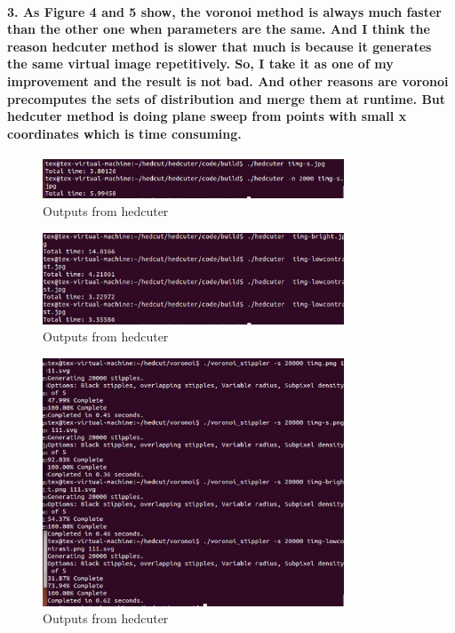 \documentclass[11pt]{article}
\begin{document}
\paragraph{3. As Figure 4 and 5 show, the voronoi method is always much faster than the other one when parameters are the same. And I think the reason hedcuter method is slower that much is because it generates the same virtual image repetitively. So, I take it as one of my improvement and the result is not bad. And other reasons are voronoi precomputes the sets of distribution and merge them at runtime. But hedcuter method is doing plane sweep from points with small x coordinates which is time consuming.}

\begin{figure}[h!]
\centering
\includegraphics[width=0.80\textwidth]{figure6.eps}
\caption{Outputs from hedcuter}
\label{threadsVsSync}
\end{figure}
\begin{figure}[h!]
\centering
\includegraphics[width=0.80\textwidth]{figure7.eps}
\caption{Outputs from hedcuter}
\label{threadsVsSync}
\end{figure}
\begin{figure}[h!]
\centering
\includegraphics[width=0.80\textwidth]{figure8.eps}
\caption{Outputs from hedcuter}
\label{threadsVsSync}
\end{figure}
\end{document}
